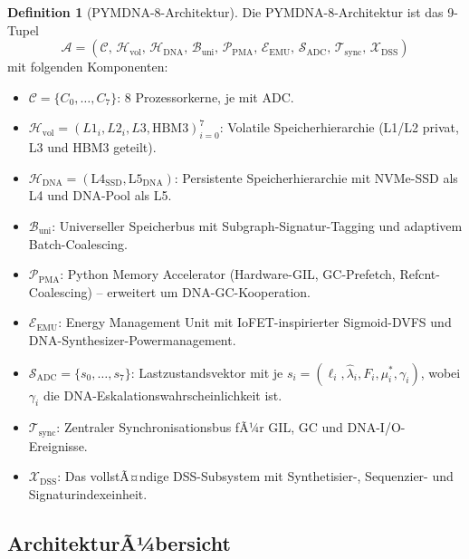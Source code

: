﻿\documentclass[a4paper,12pt]{article}
\theoremstyle{definition}
\newtheorem{definition}{Definition}[section]
\begin{document}
\begin{definition}[PYMDNA-8-Architektur]
  \label{def:pymdna8}
  Die PYMDNA-8-Architektur ist das 9-Tupel
  \[
    \mathcal{A} = \left(\mathcal{C},\, \mathcal{H}_{\mathrm{vol}},\,
    \mathcal{H}_{\mathrm{DNA}},\, \mathcal{B}_{\mathrm{uni}},\,
    \mathcal{P}_{\mathrm{PMA}},\, \mathcal{E}_{\mathrm{EMU}},\,
    \mathcal{S}_{\mathrm{ADC}},\, \mathcal{T}_{\mathrm{sync}},\,
    \mathcal{X}_{\mathrm{DSS}}\right)
  \]
  mit folgenden Komponenten:
  \begin{itemize}[noitemsep]
    \item $\mathcal{C} = \{C_0,\ldots,C_7\}$: 8 Prozessorkerne, je mit ADC.
    \item $\mathcal{H}_{\mathrm{vol}} = (L1_i, L2_i, L3, \mathrm{HBM3})_{i=0}^{7}$:
      Volatile Speicherhierarchie (L1/L2 privat, L3 und HBM3 geteilt).
    \item $\mathcal{H}_{\mathrm{DNA}} = (\mathrm{L4}_{\mathrm{SSD}}, \mathrm{L5}_{\mathrm{DNA}})$:
      Persistente Speicherhierarchie mit NVMe-SSD als L4 und DNA-Pool als L5.
    \item $\mathcal{B}_{\mathrm{uni}}$: Universeller Speicherbus mit
      Subgraph-Signatur-Tagging und adaptivem Batch-Coalescing.
    \item $\mathcal{P}_{\mathrm{PMA}}$: Python Memory Accelerator (Hardware-GIL,
      GC-Prefetch, Refcnt-Coalescing) -- erweitert um DNA-GC-Kooperation.
    \item $\mathcal{E}_{\mathrm{EMU}}$: Energy Management Unit mit
      IoFET-inspirierter Sigmoid-DVFS und DNA-Synthesizer-Powermanagement.
    \item $\mathcal{S}_{\mathrm{ADC}} = \{s_0,\ldots,s_7\}$: Lastzustandsvektor
      mit je $s_i = (\ell_i, \hat\lambda_i, F_i, \mu_i^*, \gamma_i)$,
      wobei $\gamma_i$ die DNA-Eskalationswahrscheinlichkeit ist.
    \item $\mathcal{T}_{\mathrm{sync}}$: Zentraler Synchronisationsbus
      fÃ¼r GIL, GC und DNA-I/O-Ereignisse.
    \item $\mathcal{X}_{\mathrm{DSS}}$: Das vollstÃ¤ndige DSS-Subsystem
      mit Synthetisier-, Sequenzier- und Signaturindexeinheit.
  \end{itemize}
\end{definition}

\subsection{ArchitekturÃ¼bersicht}
\end{document}
